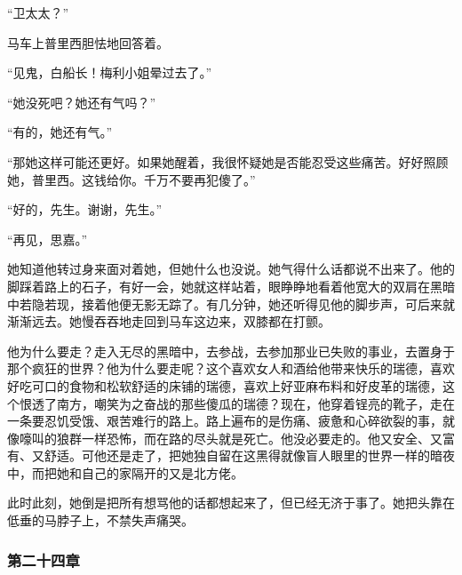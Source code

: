 \par “卫太太？”
\par 马车上普里西胆怯地回答着。
\par “见鬼，白船长！梅利小姐晕过去了。”
\par “她没死吧？她还有气吗？”
\par “有的，她还有气。”
\par “那她这样可能还更好。如果她醒着，我很怀疑她是否能忍受这些痛苦。好好照顾她，普里西。这钱给你。千万不要再犯傻了。”
\par “好的，先生。谢谢，先生。”
\par “再见，思嘉。”
\par 她知道他转过身来面对着她，但她什么也没说。她气得什么话都说不出来了。他的脚踩着路上的石子，有好一会，她就这样站着，眼睁睁地看着他宽大的双肩在黑暗中若隐若现，接着他便无影无踪了。有几分钟，她还听得见他的脚步声，可后来就渐渐远去。她慢吞吞地走回到马车这边来，双膝都在打颤。
\par 他为什么要走？走入无尽的黑暗中，去参战，去参加那业已失败的事业，去置身于那个疯狂的世界？他为什么要走呢？这个喜欢女人和酒给他带来快乐的瑞德，喜欢好吃可口的食物和松软舒适的床铺的瑞德，喜欢上好亚麻布料和好皮革的瑞德，这个恨透了南方，嘲笑为之奋战的那些傻瓜的瑞德？现在，他穿着锃亮的靴子，走在一条要忍饥受饿、艰苦难行的路上。路上遍布的是伤痛、疲惫和心碎欲裂的事，就像嚎叫的狼群一样恐怖，而在路的尽头就是死亡。他没必要走的。他又安全、又富有、又舒适。可他还是走了，把她独自留在这黑得就像盲人眼里的世界一样的暗夜中，而把她和自己的家隔开的又是北方佬。
\par 此时此刻，她倒是把所有想骂他的话都想起来了，但已经无济于事了。她把头靠在低垂的马脖子上，不禁失声痛哭。

\subsubsection{第二十四章}

